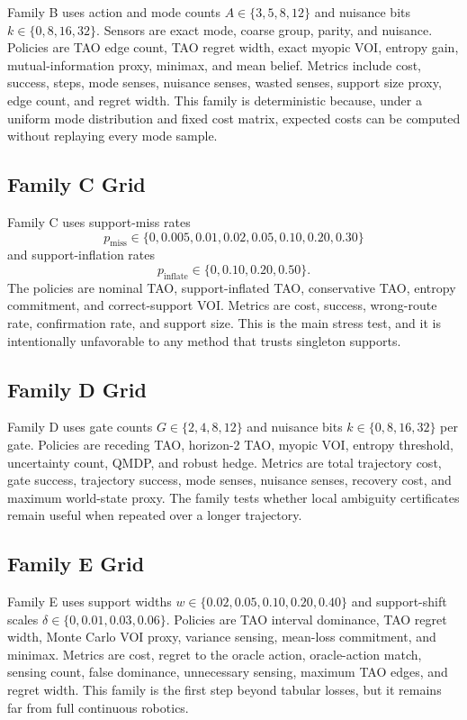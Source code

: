 \documentclass{article}
\begin{document}
Family B uses action and mode counts $A\in\{3,5,8,12\}$ and nuisance bits $k\in\{0,8,16,32\}$. Sensors are exact mode, coarse group, parity, and nuisance. Policies are TAO edge count, TAO regret width, exact myopic VOI, entropy gain, mutual-information proxy, minimax, and mean belief. Metrics include cost, success, steps, mode senses, nuisance senses, wasted senses, support size proxy, edge count, and regret width. This family is deterministic because, under a uniform mode distribution and fixed cost matrix, expected costs can be computed without replaying every mode sample.

\subsection{Family C Grid}

Family C uses support-miss rates
\[
  p_{\mathrm{miss}}\in\{0,0.005,0.01,0.02,0.05,0.10,0.20,0.30\}
\]
and support-inflation rates
\[
  p_{\mathrm{inflate}}\in\{0,0.10,0.20,0.50\}.
\]
The policies are nominal TAO, support-inflated TAO, conservative TAO, entropy commitment, and correct-support VOI. Metrics are cost, success, wrong-route rate, confirmation rate, and support size. This is the main stress test, and it is intentionally unfavorable to any method that trusts singleton supports.

\subsection{Family D Grid}

Family D uses gate counts $G\in\{2,4,8,12\}$ and nuisance bits $k\in\{0,8,16,32\}$ per gate. Policies are receding TAO, horizon-2 TAO, myopic VOI, entropy threshold, uncertainty count, QMDP, and robust hedge. Metrics are total trajectory cost, gate success, trajectory success, mode senses, nuisance senses, recovery cost, and maximum world-state proxy. The family tests whether local ambiguity certificates remain useful when repeated over a longer trajectory.

\subsection{Family E Grid}

Family E uses support widths $w\in\{0.02,0.05,0.10,0.20,0.40\}$ and support-shift scales $\delta\in\{0,0.01,0.03,0.06\}$. Policies are TAO interval dominance, TAO regret width, Monte Carlo VOI proxy, variance sensing, mean-loss commitment, and minimax. Metrics are cost, regret to the oracle action, oracle-action match, sensing count, false dominance, unnecessary sensing, maximum TAO edges, and regret width. This family is the first step beyond tabular losses, but it remains far from full continuous robotics.
\end{document}
